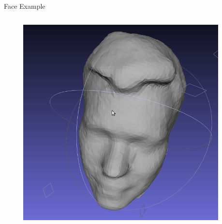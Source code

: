 \documentclass{beamer}
\begin{document}
\begin{frame}{Face Example}

\begin{columns}
\begin{column}[T]{5cm}
\begin{figure}[t]
    \includegraphics[width=\textwidth]{ChrisOrig.png}
\end{figure}
\end{column}

\begin{column}[T]{5cm}

\end{column}
\end{columns}


\end{frame}
\end{document}
